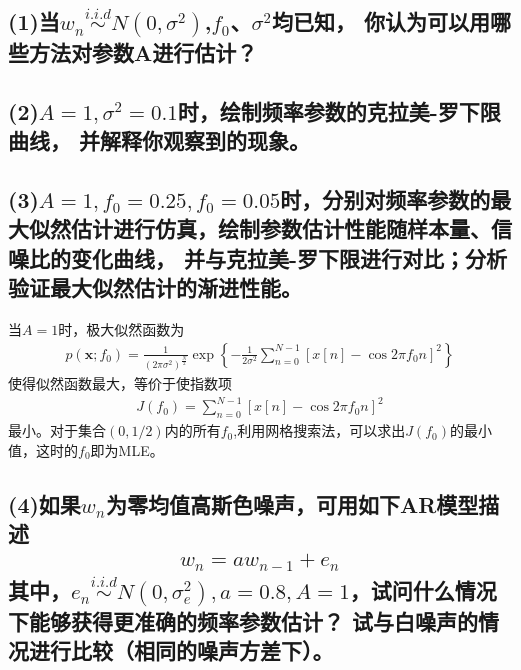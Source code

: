 \documentclass[fontset=windows]{article}
\numberwithin{figure}{section}
\begin{document}
\subsection*{(1)当\(w_n\overset{i.i.d}{\sim} N(0,\sigma^2)\),\(f_0\)、\(\sigma^2\)均已知，
	你认为可以用哪些方法对参数A进行估计？}

\subsection*{(2)\(A=1,\sigma^2=0.1\)时，绘制频率参数的克拉美-罗下限曲线，
	并解释你观察到的现象。}

\subsection*{(3)\(A=1,f_0=0.25,f_0=0.05\)时，分别对频率参数的最大似然估计进行仿真，绘制参数估计性能随样本量、信噪比的变化曲线，
	并与克拉美-罗下限进行对比；分析验证最大似然估计的渐进性能。}

当\(A=1\)时，极大似然函数为
\begin{align*}
	p(\mathbf{x};f_0)=\frac{1}{(2\pi \sigma^2)^{\frac{N}{2}}}
	\exp\left\{-\frac{1}{2\sigma^2}\sum_{n=0}^{N-1}\left[x[n]-\cos2\pi f_0n\right]^2\right\}
\end{align*}
使得似然函数最大，等价于使指数项
\begin{align*}
	J(f_0)=\sum_{n=0}^{N-1}\left[x[n]-\cos2\pi f_0n\right]^2
\end{align*}
最小。对于集合\((0,1/2)\)内的所有\(f_0\),利用网格搜索法，可以求出\(J(f_0)\)的最小值，这时的\(f_0\)即为MLE。

\newpage

\subsection*{(4)如果\(w_n\)为零均值高斯色噪声，可用如下AR模型描述
	\begin{align*}
		w_n=aw_{n-1}+e_n
	\end{align*}
	其中，\(e_n\overset{i.i.d}{\sim}N(0,\sigma_e^2),a=0.8,A=1\)，试问什么情况下能够获得更准确的频率参数估计？
	试与白噪声的情况进行比较（相同的噪声方差下）。}
\end{document}
